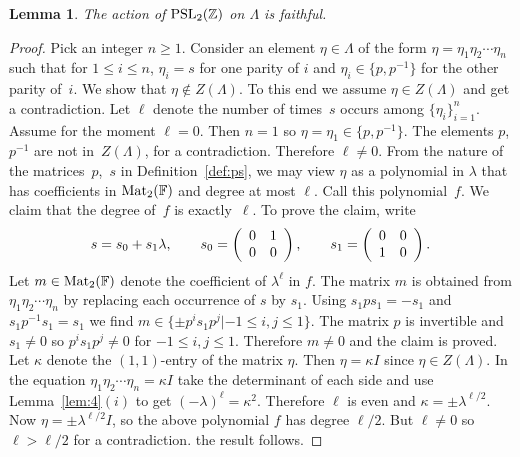 \documentclass[pdftex]{sigma}
\numberwithin{equation}{section}
\newtheorem{Lemma}[Theorem]{Lemma}
\begin{document}
\begin{Lemma}
\label{lem:faith1}
The action of
${\rm  {PSL}}_2(\mathbb Z)$ on $\Lambda $ is faithful.
\end{Lemma}

\begin{proof}
Pick an integer $n\geq 1$.
Consider an element $\eta \in \Lambda $
of the form
$\eta =\eta_1 \eta_2 \cdots \eta_n$ such that
 for $1 \leq i \leq n$,  $\eta_i=s$
for one parity of $i$ and
$\eta_i \in \lbrace p,p^{-1} \rbrace$ for the other parity of~$i$.
We show that $\eta \not\in Z(\Lambda)$.
To this end we assume
 $\eta \in Z(\Lambda )$ and get a contradiction.
Let $\ell$ denote the number of times~$s$ occurs among
$\lbrace \eta_i\rbrace_{i=1}^n$.
Assume for the moment $\ell = 0$.
Then $n=1$ so
$\eta =\eta_1 \in \lbrace p, p^{-1}\rbrace$.
The elements $p$, $p^{-1}$ are not in~$Z(\Lambda)$, for a contradiction.
Therefore $\ell \neq 0$.
From the nature of the matrices~$p$,~$s$ in Def\/inition~\ref{def:ps},
we may
view $\eta $ as a polynomial in $\lambda$
that has
coef\/f\/icients in
${\rm {Mat}}_2(\mathbb F)$ and degree at most $\ell$.
Call this polynomial~$f$.
We claim that the degree of~$f$ is exactly~$\ell$.
To prove the claim,
write
\begin{gather*}
s = s_0+ s_1 \lambda,   \qquad
s_0= \left(
\begin{array}{  c c}
0 & 1  \\
0 & 0
\end{array}
\right),
\qquad
s_1= \left(
\begin{array}{  c c}
0 & 0  \\
1 & 0
\end{array}
\right).
\end{gather*}
Let $m
\in {\rm {Mat}}_2(\mathbb F)$ denote the coef\/f\/icient of
$\lambda^\ell$ in $f$.
The matrix $m$ is obtained from
$\eta_1 \eta_2\cdots \eta_n$ by
replacing each occurrence of $s$ by $s_1$.
Using $s_1p s_1=-s_1$ and
 $s_1p^{-1} s_1=s_1$  we f\/ind
$m\in \lbrace \pm p^i s_1 p^j |
-1 \leq i,j\leq 1\rbrace $. The matrix $p$ is invertible
and $s_1\not=0$ so
$p^i s_1 p^j\not=0$ for $-1 \leq i,j \leq 1$.
Therefore $m\not=0$ and the claim is proved.
Let $\kappa $ denote the $(1,1)$-entry of the matrix $\eta $.
Then $\eta=\kappa I$ since $\eta \in Z(\Lambda )$.
In the equation
$\eta_1 \eta_2\cdots \eta_n=\kappa I$ take the determinant of
each side and use
Lemma~\ref{lem:4}$(i)$
to get $(-\lambda)^\ell = \kappa^2$.
Therefore $\ell $ is even and
$\kappa=\pm \lambda^{\ell/2}$.
Now $\eta =\pm \lambda^{\ell/2} I$, so
the above polynomial $f$ has degree $\ell/2$.
But $\ell \not=0$ so $\ell > \ell/2$
for a contradiction.
the result follows.
\end{proof}
\end{document}
